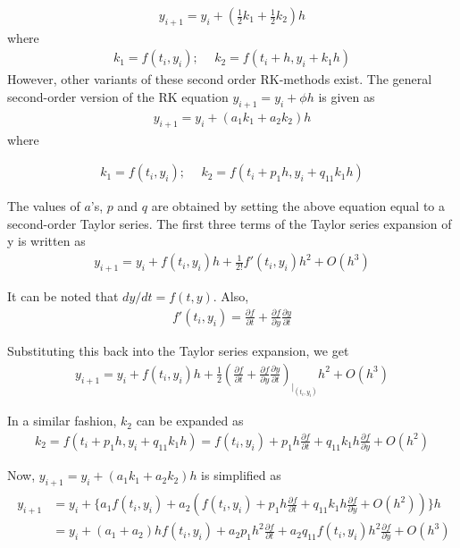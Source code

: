 \documentclass[book.tex]{subfiles}
\begin{document}
\begin{align}
y_{i+1} = y_{i} + \left (\frac{1}{2}k_1 + \frac{1}{2}k_2\right )h
\end{align}
where
\begin{align}
k_1 = f(t_i,y_i);\hspace{15pt}	k_2 = f(t_i + h,y_i + k_1h)	
\end{align}
However, other variants of these second order RK-methods exist. The general second-order version of the RK equation $y_{i+1} = y_{i} + \phi h$  is given as
\begin{align}
y_{i+1} = y_{i} + (a_1k_1 + a_2k_2)h
\end{align}
where

\begin{align}
k_1 = f(t_i,y_i) ; \hspace{15pt} k_2 = f(t_i + p_1h,y_i + q_{11}k_1h)		
\end{align}

The values of $a$'s, $p$ and $q$ are obtained by setting the above equation equal to a second-order Taylor series. The first three terms of the Taylor series expansion of y is written as  
\begin{align}
y_{i+1} = y_i + f(t_i,y_i)h + \frac{1}{2!}f'(t_i,y_i)h^2 + O(h^3)	
\end{align}

It can be noted that $dy/dt = f(t,y)$. Also,
\begin{align}
f'(t_i,y_i) =\frac{\partial f}{\partial t} + \frac{\partial f}{\partial y}\frac{\partial y}{\partial t}
\end{align}

Substituting this back into the Taylor series expansion, we get
\begin{align}
y_{i+1} = y_i + f(t_i,y_i)h + \frac{1}{2}\left (\frac{\partial f}{\partial t} + \frac{\partial f}{\partial y}\frac{\partial y}{\partial t}\right )_{|_{(t_i,y_i)}}h^2 + O(h^3)
\end{align}

In a similar fashion, $k_2$ can be expanded as
\begin{align}
k_2 = f(t_i + p_1h,y_i + q_{11}k_1h) = f(t_i,y_i) + p_1h\frac{\partial f}{\partial t} +  q_{11}k_1h\frac{\partial f}{\partial y} + O(h^2)	
\end{align}

Now, $y_{i+1} = y_{i} + (a_1k_1 + a_2k_2)h$ is simplified as
\begin{align}
\begin{split}
y_{i+1} & = y_i + \{a_1f(t_i,y_i) +  a_2(f(t_i,y_i) + p_1h\frac{\partial f}{\partial t} +  q_{11}k_1h\frac{\partial f}{\partial y} + O(h^2))\}h \\
 & = y_i + (a_1+a_2)hf(t_i,y_i) + a_2p_1h^2\frac{\partial f}{\partial t} + a_2q_{11}f(t_i,y_i)h^2\frac{\partial f}{\partial y}+ O(h^3)
\end{split}
\end{align}
\end{document}
